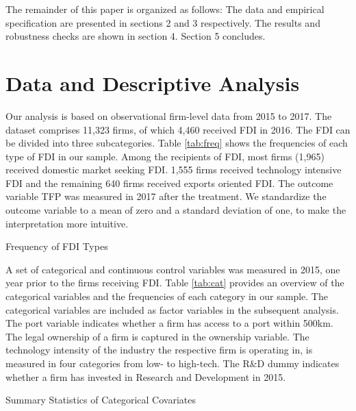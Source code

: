 \documentclass[a4paper,11pt]{scrartcl}
\begin{document}
The remainder of this paper is organized as follows: The data and empirical specification are presented in sections 2 and 3 respectively. The results and robustness checks are shown in section 4. Section 5 concludes.

\section{Data and Descriptive Analysis}
Our analysis is based on observational firm-level data %
from 2015 to 2017. The dataset comprises 11,323 firms, of which 4,460 received FDI in 2016. The FDI can be divided into three subcategories. Table \ref{tab:freq} shows the frequencies of each type of FDI in our sample. Among the recipients of FDI, most firms (1,965) received domestic market seeking FDI. 1,555 firms received technology intensive FDI and the remaining 640 firms received exports oriented FDI. The outcome variable TFP was measured in 2017%
 after the treatment. We standardize the outcome variable to a mean of zero and a standard deviation of one, to make the interpretation more intuitive. 

\begin{table}[h!]
	\centering
	\caption{Frequency of FDI Types} 
	
\label{tab:freq}
\end{table}

A set of categorical and continuous control variables was measured in 2015, one year prior to the firms receiving FDI. Table \ref{tab:cat} provides an overview of the categorical variables and the frequencies of each category in our sample. The categorical variables are included as factor variables in the subsequent analysis. The port variable indicates whether a firm has access to a port within 500km. The legal ownership of a firm is captured in the ownership variable. The technology intensity of the industry the respective firm is operating in, is measured in four categories from low- to high-tech. The R\&D dummy indicates whether a firm has invested in Research and Development in 2015. \\

\begin{table}[h!]
	\centering
	\caption{Summary Statistics of Categorical Covariates} 
	
	\label{tab:cat}	
\end{table}
\end{document}
